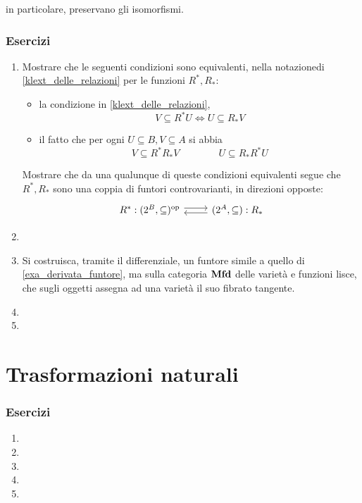 \begin{lemma}\label{lem_funtori_preservano_comm}
	 in particolare, preservano gli isomorfismi.
\end{lemma}

\begin{definition}\label{def_cat_cocomma}
\end{definition}


\subsubsection*{Esercizi}
\begin{enumerate}
	\item Mostrare che le seguenti condizioni sono equivalenti, nella notazionedi \ref{klext_delle_relazioni} per le funzioni $R^*,R_*$:
	\begin{itemize}
		\item la condizione in \ref{klext_delle_relazioni}, 
		\[V\subseteq R^*U\iff U\subseteq R_*V\]
		\item il fatto che per ogni $U\subseteq B,V\subseteq A$ si abbia 
		\[V\subseteq R^*R_*V\qquad\qquad U\subseteq R_*R^*U\]
	\end{itemize}
	Mostrare che da una qualunque di queste condizioni equivalenti segue che $R^*,R_*$ sono una coppia di funtori controvarianti, in direzioni opposte:
	\[\begin{tikzcd}
		R^* : (2^B,\subseteq)^\op \ar[r, shift left] & (2^A,\subseteq) : R_* \ar[l, shift left]
	\end{tikzcd}\]
	\item
	\item Si costruisca, tramite il differenziale, un funtore simile a quello di \ref{exa_derivata_funtore}, ma sulla categoria \(\mathbf{Mfd}\) delle varietà e funzioni lisce, che sugli oggetti assegna ad una varietà il suo fibrato tangente.
	\item
	\item
\end{enumerate}

\section{Trasformazioni naturali}\label{sec_tnat}
\subsubsection*{Esercizi}
\begin{enumerate}
	\item
	\item
	\item
	\item
	\item
\end{enumerate}
